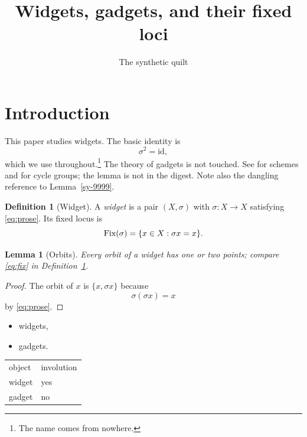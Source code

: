 \documentclass{amsart}
\title{Widgets, gadgets, and their fixed loci}
\author{The synthetic quilt}
\theoremstyle{plain}
\newtheorem{lemma}[theorem]{Lemma}
\theoremstyle{definition}
\newtheorem{definition}[theorem]{Definition}
\theoremstyle{remark}
\begin{document}
\maketitle

\section{Introduction}\label{sy-0100}

This paper studies widgets. The basic identity is
\begin{equation}\label{eq:prose}
\sigma^2 = \mathrm{id},
\end{equation}
which we use throughout.\footnote{The name comes from nowhere.} The \GW{} theory of gadgets is not touched. See \cite[Chapter II]{Har77} for schemes and \cite[Theorem 2.1]{Kre99} for cycle groups; the lemma \cite[Lemma 9]{Kre99} is not in the digest. Note also the dangling reference to Lemma~\ref{sy-9999}.

\begin{definition}[Widget]\label{sy-0001}
A \emph{widget} is a pair $(X,\sigma)$ with $\sigma\colon X\to X$ satisfying \eqref{eq:prose}. Its fixed locus is
\begin{equation}\label{eq:fix}
\operatorname{Fix}(\sigma) = \{x \in X : \sigma x = x\}.
\end{equation}
\end{definition}


\begin{lemma}[Orbits]\label{sy-0002}
Every orbit of a widget has one or two points; compare \eqref{eq:fix} in Definition~\ref{sy-0001}.
\end{lemma}
\begin{proof}
The orbit of $x$ is $\{x, \sigma x\}$ because
\begin{equation}\label{eq:step}
\sigma(\sigma x) = x
\end{equation}
by \eqref{eq:prose}.
\end{proof}


\begin{itemize}
\item widgets,
\item gadgets.
\end{itemize}

\begin{tabular}{ll}
object & involution \\
widget & yes \\
gadget & no
\end{tabular}
\end{document}
